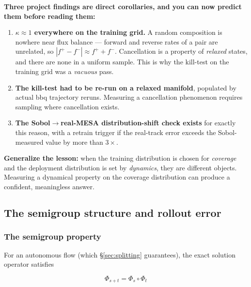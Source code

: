 \textbf{Three project findings are direct corollaries, and you can now predict
them before reading them:}

\begin{enumerate}
\item \textbf{$\kappa \approx 1$ everywhere on the training grid.} A random
      composition is nowhere near flux balance --- forward and reverse rates of
      a pair are unrelated, so $|f^+-f^-| \approx f^++f^-$. Cancellation is a
      property of \emph{relaxed} states, and there are none in a uniform sample.
      This is why the kill-test on the training grid was a \emph{vacuous} pass.
\item \textbf{The kill-test had to be re-run on a relaxed manifold}, populated
      by actual bbq trajectory reruns. Measuring a cancellation phenomenon
      requires sampling where cancellation exists.
\item \textbf{The Sobol$\to$real-MESA distribution-shift check exists} for
      exactly this reason, with a retrain trigger if the real-track error
      exceeds the Sobol-measured value by more than $3\times$.
\end{enumerate}

\begin{aside}
\textbf{Generalize the lesson:} when the training distribution is chosen for
\emph{coverage} and the deployment distribution is set by \emph{dynamics}, they
are different objects. Measuring a dynamical property on the coverage
distribution can produce a confident, meaningless answer.
\end{aside}

\subsection{The semigroup structure and rollout error}
\label{sec:rollouterror}

\subsubsection{The semigroup property}
\label{sec:semigroup}

For an autonomous flow (which \S\ref{sec:splitting} guarantees), the exact
solution operator satisfies

\begin{equation}
\Phi_{s+t} = \Phi_s \circ \Phi_t
\label{eq:semigroup}
\end{equation}

